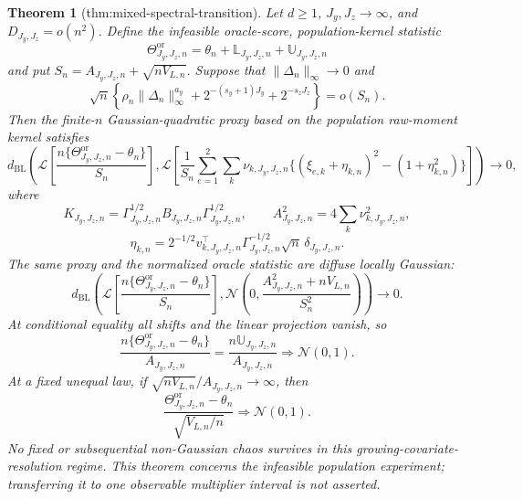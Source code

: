 \documentclass{article}
\newtheorem{theorem}{Theorem}
\begin{document}
\begin{theorem}[thm:mixed-spectral-transition]\label{thm:mixed-spectral-transition}
Let \(d\ge1\), \(J_y,J_z\to\infty\), and \(D_{J_y,J_z}=o(n^2)\).  Define the infeasible oracle-score, population-kernel statistic
\[
\Theta^{\mathrm{or}}_{J_y,J_z,n}
=\theta_n+\mathbb L_{J_y,J_z,n}+\mathbb U_{J_y,J_z,n}
\]
and put \(S_n=A_{J_y,J_z,n}+\sqrt{nV_{L,n}}\).  Suppose that \(\|\Delta_n\|_\infty\to0\) and
\[
\sqrt n\left\{
\rho_n\|\Delta_n\|_\infty^{a_y}
+2^{-(s_y+1)J_y}+2^{-s_zJ_z}
\right\}=o(S_n).
\]
Then the finite-\(n\) Gaussian-quadratic proxy based on the population raw-moment kernel satisfies
\[
d_{\mathrm{BL}}\!\left(
\mathcal L\left[\frac{n\{\Theta^{\mathrm{or}}_{J_y,J_z,n}-\theta_n\}}{S_n}\right],
\mathcal L\left[\frac1{S_n}\sum_{e=1}^2\sum_k\nu_{k,J_y,J_z,n}
\{(\xi_{e,k}+\eta_{k,n})^2-(1+\eta_{k,n}^2)\}\right]
\right)\to0,
\]
where
\[
K_{J_y,J_z,n}=\Gamma_{J_y,J_z,n}^{1/2}B_{J_y,J_z,n}\Gamma_{J_y,J_z,n}^{1/2},
\qquad
A_{J_y,J_z,n}^2=4\sum_k\nu_{k,J_y,J_z,n}^2,
\]
\[
\eta_{k,n}=2^{-1/2}v_{k,J_y,J_z,n}^{\top}\Gamma_{J_y,J_z,n}^{-1/2}\sqrt n\,\delta_{J_y,J_z,n}.
\]
The same proxy and the normalized oracle statistic are diffuse locally Gaussian:
\[
d_{\mathrm{BL}}\!\left(
\mathcal L\left[\frac{n\{\Theta^{\mathrm{or}}_{J_y,J_z,n}-\theta_n\}}{S_n}\right],
\mathcal N\!\left(0,\frac{A_{J_y,J_z,n}^2+nV_{L,n}}{S_n^2}\right)
\right)\to0.
\]
At conditional equality all shifts and the linear projection vanish, so
\[
\frac{n\{\Theta^{\mathrm{or}}_{J_y,J_z,n}-\theta_n\}}{A_{J_y,J_z,n}}
=\frac{n\mathbb U_{J_y,J_z,n}}{A_{J_y,J_z,n}}
\Rightarrow\mathcal N(0,1).
\]
At a fixed unequal law, if \(\sqrt{nV_{L,n}}/A_{J_y,J_z,n}\to\infty\), then
\[
\frac{\Theta^{\mathrm{or}}_{J_y,J_z,n}-\theta_n}{\sqrt{V_{L,n}/n}}
\Rightarrow\mathcal N(0,1).
\]
No fixed or subsequential non-Gaussian chaos survives in this growing-covariate-resolution regime.  This theorem concerns the infeasible population experiment; transferring it to one observable multiplier interval is not asserted.
\end{theorem}
\end{document}
